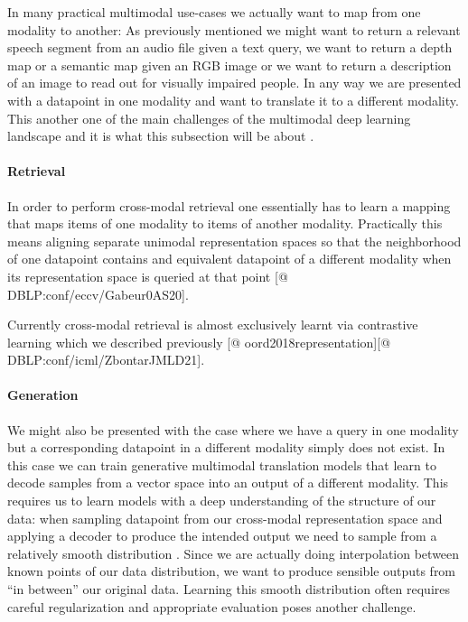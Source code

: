 \documentclass[
]{krantz}
\begin{document}
In many practical multimodal use-cases we actually want to map from one modality to another: As previously mentioned we might want to return a relevant speech segment from an audio file given a text query, we want to return a depth map or a semantic map given an RGB image or we want to return a description of an image to read out for visually impaired people\citep{bachmann2022multimae}. In any way we are presented with a datapoint in one modality and want to translate it to a different modality. This another one of the main challenges of the multimodal deep learning landscape and it is what this subsection will be about \citep{DBLP:journals/mt/SulubacakCGREST20}.

\hypertarget{retrieval}{%
\paragraph{Retrieval}\label{retrieval}}

In order to perform cross-modal retrieval one essentially has to learn a mapping that maps items of one modality to items of another modality. Practically this means aligning separate unimodal representation spaces so that the neighborhood of one datapoint contains and equivalent datapoint of a different modality when its representation space is queried at that point \citep{shvetsova2021everything}{[}@ DBLP:conf/eccv/Gabeur0AS20{]}.

Currently cross-modal retrieval is almost exclusively learnt via contrastive learning which we described previously \citep{DBLP:conf/icml/ChenK0H20}{[}@ oord2018representation{]}{[}@ DBLP:conf/icml/ZbontarJMLD21{]}.

\hypertarget{generation}{%
\paragraph{Generation}\label{generation}}

We might also be presented with the case where we have a query in one modality but a corresponding datapoint in a different modality simply does not exist. In this case we can train generative multimodal translation models that learn to decode samples from a vector space into an output of a different modality. This requires us to learn models with a deep understanding of the structure of our data: when sampling datapoint from our cross-modal representation space and applying a decoder to produce the intended output we need to sample from a relatively smooth distribution \citep{DBLP:journals/jstsp/ZhangYHD20}. Since we are actually doing interpolation between known points of our data distribution, we want to produce sensible outputs from ``in between'' our original data. Learning this smooth distribution often requires careful regularization and appropriate evaluation poses another challenge\citep{baltrušaitis2017multimodal}.
\end{document}
